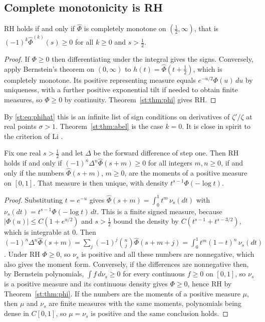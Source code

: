 \subsection{Complete monotonicity is RH}
\begin{theorem}\label{st:thm:cm}
RH holds if and only if $\hat\Phi$ is completely monotone on $(\tfrac12,\infty)$, that is $(-1)^k\hat\Phi^{(k)}(s)\ge0$ for all $k\ge0$ and $s>\tfrac12$.
\end{theorem}
\begin{proof}
If $\Phi\ge0$ then differentiating under the integral gives the signs. Conversely, apply Bernstein's theorem on $(0,\infty)$ to $h(t)=\hat\Phi(t+\tfrac12)$, which is completely monotone. Its positive representing measure equals $e^{-u/2}\Phi(u)\,du$ by uniqueness, with a further positive exponential tilt if needed to obtain finite measures, so $\Phi\ge0$ by continuity. Theorem~\ref{st:thm:phi} gives RH.
\end{proof}
By \eqref{st:eq:phihat} this is an infinite list of sign conditions on derivatives of $\zeta'/\zeta$ at real points $\sigma>1$. Theorem~\ref{st:thm:abel} is the case $k=0$. It is close in spirit to the criterion of Li \cite{Li97}.
\begin{corollary}\label{st:cor:hausdorff}
Fix one real $s>\tfrac12$ and let $\Delta$ be the forward difference of step one. Then RH holds if and only if $(-1)^n\Delta^n\hat\Phi(s+m)\ge0$ for all integers $m,n\ge0$, if and only if the numbers $\hat\Phi(s+m)$, $m\ge0$, are the moments of a positive measure on $[0,1]$. That measure is then unique, with density $t^{s-1}\Phi(-\log t)$.
\end{corollary}
\begin{proof}
Substituting $t=e^{-u}$ gives $\hat\Phi(s+m)=\int_0^1t^m\,\nu_s(dt)$ with $\nu_s(dt)=t^{s-1}\Phi(-\log t)\,dt$. This is a finite signed measure, because $|\Phi(u)|\le C(1+e^{u/2})$ and $s>\tfrac12$ bound the density by $C(t^{s-1}+t^{s-3/2})$, which is integrable at $0$. Then $(-1)^n\Delta^n\hat\Phi(s+m)=\sum_j(-1)^j\binom nj\hat\Phi(s+m+j)=\int_0^1t^m(1-t)^n\,\nu_s(dt)$. Under RH $\Phi\ge0$, so $\nu_s$ is positive and all these numbers are nonnegative, which also gives the moment form. Conversely, if the differences are nonnegative then, by Bernstein polynomials, $\int f\,d\nu_s\ge0$ for every continuous $f\ge0$ on $[0,1]$, so $\nu_s$ is a positive measure and its continuous density gives $\Phi\ge0$, hence RH by Theorem~\ref{st:thm:phi}. If the numbers are the moments of a positive measure $\mu$, then $\mu$ and $\nu_s$ are finite measures with the same moments, polynomials being dense in $C[0,1]$, so $\mu=\nu_s$ is positive and the same conclusion holds.
\end{proof}
